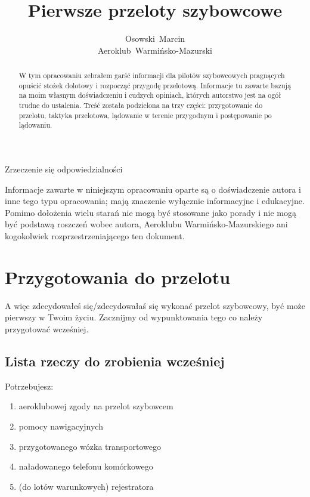 \documentclass{article}
\title{Pierwsze przeloty szybowcowe}
\author{Osowski~Marcin\\Aeroklub~Warmińsko-Mazurski}
\begin{document}
\maketitle
\newpage

\begin{abstract}
W tym opracowaniu zebrałem garść informacji dla pilotów szybowcowych
pragnących opuścić stożek dolotowy i rozpocząć
przygodę przelotową. Informacje tu zawarte bazują na moim
własnym doświadczeniu i cudzych opiniach, których autorstwo jest na ogół
trudne do ustalenia. Treść została podzielona na trzy części:
przygotowanie do przelotu, taktyka przelotowa, 
lądowanie w terenie przygodnym i postępowanie po lądowaniu.
\end{abstract}
\newpage

\begin{center}\begin{huge}
Zrzeczenie się odpowiedzialności
\end{huge}\end{center}
Informacje zawarte w niniejszym opracowaniu oparte są o doświadczenie
autora i inne tego typu opracowania; mają znaczenie wyłącznie informacyjne
i edukacyjne. Pomimo dołożenia wielu starań nie mogą być stosowane
jako porady i nie mogą być podstawą roszczeń wobec autora,
Aeroklubu Warmińsko-Mazurskiego ani kogokolwiek rozprzestrzeniającego
ten dokument.
\newpage

\tableofcontents
\newpage

\section{Przygotowania do przelotu}
A więc zdecydowałeś się/zdecydowałaś się wykonać przelot szybowcowy, być może
pierwszy w Twoim życiu. Zacznijmy od wypunktowania tego co należy
przygotować wcześniej.

\subsection{Lista rzeczy do zrobienia wcześniej}
Potrzebujesz:
\begin{enumerate}
\item aeroklubowej zgody na przelot szybowcem
\item pomocy nawigacyjnych
\item przygotowanego wózka transportowego
\item naładowanego telefonu komórkowego
\item (do lotów warunkowych) rejestratora
\end{enumerate}
\end{document}
